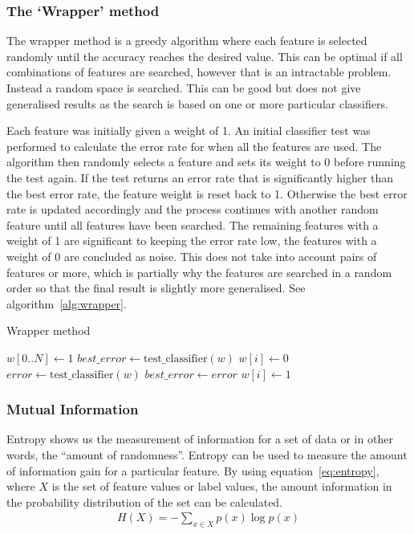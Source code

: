 \subsubsection{The `Wrapper' method}
The wrapper method is a greedy algorithm where each feature is selected randomly until the accuracy reaches the desired value.
This can be optimal if all combinations of features are searched, however that is an intractable problem. Instead a random space
is searched. This can be good but does not give generalised results as the search is based on one or more particular
classifiers.

Each feature was initially given a weight of 1. An initial classifier test was performed to calculate the error rate for when
all the features are used. The algorithm then randomly selects a feature and sets its weight to 0 before running the test again.
If the test returns an error rate that is significantly higher than the best error rate, the feature weight is reset back to 1.
Otherwise the best error rate is updated accordingly and the process continues with another random feature until all features
have been searched. The remaining features with a weight of 1 are significant to keeping the error rate low, the features with a
weight of 0 are concluded as noise. This does not take into account pairs of features or more, which is partially why the
features are searched in a random order so that the final result is slightly more generalised. See algorithm~\ref{alg:wrapper}.

\begin{algorithm}
    \caption{Wrapper method}
    \label{alg:wrapper}
    \begin{algorithmic}
        \STATE $w[0..N] \gets 1$
        \STATE $best\_ error \gets \mathrm{test\_ classifier}(w)$
            \STATE $w[i] \gets 0$
            \STATE $error \gets \mathrm{test\_ classifier}(w)$
                \STATE $best\_error \gets error$
                \STATE $w[i] \gets 1$
            \ENDIF
        \ENDFOR
    \end{algorithmic}
\end{algorithm}


\subsubsection{Mutual Information}
\label{sec:mutual_informaton}
Entropy shows us the measurement of information for a set of data or in other words, the ``amount of randomness''. Entropy can
be used to measure the amount of information gain for a particular feature. By using equation~\ref{eq:entropy}, where $X$ is
the set of feature values or label values, the amount information in the probability distribution of the set can be calculated.
\begin{align}
    \label{eq:entropy}
    H(X) = -\sum_{x \in X} p(x) \log p(x)
\end{align}


